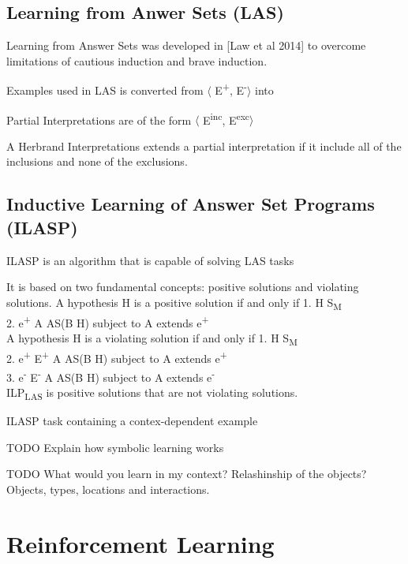 \documentclass[12pt,twoside]{report}
\begin{document}
\subsection{Learning from Anwer Sets (LAS)}

Learning from Answer Sets was developed in [Law et al 2014] to overcome limitations of cautious induction and brave induction.


Examples used in LAS is converted from $\langle$ E\textsuperscript{+}, E\textsuperscript{-}$\rangle$ into

Partial Interpretations are of the form $\langle$ E\textsuperscript{inc}, E\textsuperscript{exc}$\rangle$

A Herbrand Interpretations extends a partial interpretation if it include all of the inclusions and none of the exclusions.

\subsection{Inductive Learning of Answer Set Programs (ILASP)}

ILASP is an algorithm that is capable of solving LAS tasks

It is based on two fundamental concepts: positive solutions and violating solutions.
A hypothesis H is a positive solution if and only if
1. H \subseteq S\textsubscript{M} \\
2. \forall e\textsuperscript{+} \in \exists A \in AS(B \cup H) subject to A extends e\textsuperscript{+}\\

A hypothesis H is a violating solution if and only if
1. H \subseteq S\textsubscript{M} \\
2. \forall e\textsuperscript{+} \in E\textsuperscript{+} \exists A \in AS(B \cup H) subject to A extends e\textsuperscript{+}\\
3. \exists e\textsuperscript{-} \in E\textsuperscript{-} \exists A \in AS(B \cup H) subject to A extends e\textsuperscript{-}\\


ILP\textsubscript{LAS} is positive solutions that are not violating solutions.

ILASP task containing a contex-dependent example

TODO Explain how symbolic learning works

TODO What would you learn in my context? Relashinship of the objects?
Objects, types, locations and interactions.

\section{Reinforcement Learning}
\label{rl}
\end{document}
